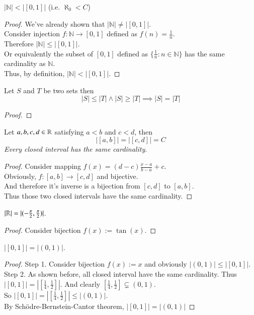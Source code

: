 \documentclass[10pt]{article}
\begin{document}
		\begin{proposition}
			$|\mathbb{N}| < |[0, 1]|$ (i.e. $\aleph_0 < C$)
			\begin{proof}
				We've already shown that $|\mathbb{N}| \neq |[0,1]|$. \\
				Consider injection $f:\mathbb{N}\to [0,1]$ defined as $f(n) = \frac{1}{n}$. \\
				Therefore $|\mathbb{N}| \leq |[0,1]|$. \\
				Or equivalently the subset of $[0,1]$ defined as $\{\frac{1}{n}:n \in \mathbb{N}\}$ has the same cardinality as $\mathbb{N}$. \\
				Thus, by definition, $|\mathbb{N}| < |[0, 1]|$.
			\end{proof}
		\end{proposition}
		
		\begin{theorem}
			Let $S$ and $T$ be two sets then
			\[
				|S| \leq |T| \land |S| \geq |T| \implies |S| = |T|
			\]
			\begin{proof}
				
			\end{proof}
		\end{theorem}
		
		\begin{proposition}
			Let $a,b,c,d \in \mathbb{R}$ satisfying $a<b$ and $c<d$, then
			\[
				|[a,b]| = |[c,d]| = C
			\]
			\emph{Every closed interval has the same cardinality}.
			\begin{proof}
				Consider mapping $f(x) = (d-c)\frac{x-a}{b-a}+c$. \\
				Obviously, $f:[a,b] \to [c, d]$ and bijective. \\
				And therefore it's inverse is a bijection from $[c,d]$ to $[a,b]$. \\
				Thus those two closed intervals have the same cardinality.
			\end{proof}
		\end{proposition}
		
		\begin{proposition}
			$|\mathbb{R}| = |(-\frac{\pi}{2}, \frac{\pi}{2})|$.
			\begin{proof}
				Consider bijection $f(x):= \tan(x)$.
			\end{proof}
		\end{proposition}
		
		\begin{proposition}
			$|[0, 1]| = |(0, 1)|$.
			\begin{proof}
				Step 1. Consider bijection $f(x):=x$ and obviously $|(0, 1)| \leq |[0, 1]|$. \\
				Step 2. As shown before, all closed interval have the same cardinality. Thus $|[0, 1]| = |[\frac{1}{4}, \frac{1}{2}]|$. And clearly $[\frac{1}{4}, \frac{1}{2}] \subsetneq (0, 1)$. \\
				So $|[0,1]| = |[\frac{1}{4}, \frac{1}{2}]| \leq |(0, 1)|$. \\
				By Schödre-Bernstein-Cantor theorem, $|[0,1]|=|(0,1)|$
			\end{proof}
		\end{proposition}
		
\end{document}
